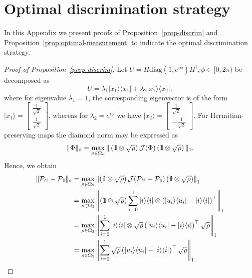 \documentclass[preprint,12pt, a4paper]{elsarticle}
\newcommand{\ket}[1]{\ensuremath{|#1\rangle}}
\newcommand{\bra}[1]{\ensuremath{\langle#1|}}
\newcommand{\ketbra}[2]{\ensuremath{\ket{#1}\bra{#2}}}
\newcommand{\proj}[1]{\ensuremath{\ketbra{#1}{#1}}}
\newcommand{\1}{{\rm 1\hspace{-0.9mm}l}}
\newcommand{\Id}{{\rm 1\hspace{-0.9mm}l}}
\newcommand{\PP}{\mathcal{P}}
\newcommand{\diag}{\mathrm{diag}}
\begin{document}
\section{Optimal discrimination strategy}
In this Appendix we present proofs of Proposition~\ref{prop-discrim} and Proposition~\ref{prop:optimal-measurement} to indicate the optimal discrimination strategy.
\begin{proof}[Proof of Proposition~\ref{prop-discrim}]
	Let $U = H\diag(1, e^{i \phi}) H^\dagger, \phi \in [0, 
	2\pi)$ be decomposed as 
	\begin{equation}
	U= \lambda_1 \ketbra{x_1}{x_1} + \lambda_2 \ketbra{x_1}{x_2}, 
	\end{equation}
	where  for eigenvalue $\lambda_1 = 1$, the corresponding 
	eigenvector is 
	of the form $\ket{x_1} = \left[\begin{array}{c}\frac{1}{\sqrt{2}}\\\frac{1}{\sqrt{2}}\end{array}\right]
	$,
	whereas for  $\lambda_2 = e^{i \phi}$ we have $\ket{x_2} = \left[\begin{array}{c}\frac{1}{\sqrt{2}}\\-\frac{1}{\sqrt{2}}\end{array}\right] 
	$.
	For Hermitian-preserving maps \cite{watrous} the diamond norm may be expressed as
	\begin{equation}
	\| \Phi  \|_\diamond =  \max_{\rho \in \Omega_d} \| \left( \Id \otimes \sqrt{\rho} \right) \mathcal{J}(\Phi)  \left( \Id \otimes \sqrt{\rho} \right)  \|_1.  \end{equation}
	Hence, we obtain
	\begin{equation}
	\begin{split}
	\| \PP_{U} - \PP_{\Id}  \|_\diamond 
	& =  \max_{\rho \in \Omega_2} \left\| \left( \Id \otimes \sqrt{\rho} \right) 
	\mathcal{J}(\PP_{U} - \PP_{\Id} )  \left( \Id \otimes \sqrt{\rho} \right)  \right\|_1   
	\\ 
	& =  \max_{\rho \in \Omega_2} \left\| \left( \Id \otimes \sqrt{\rho} \right) 
	\sum_{i=0}^{1} \proj{i} \otimes \left( \proj{u_i} - \proj{i} \right)^\top  
	\right\|_1  \\ 
	& = \max_{\rho \in \Omega_2} \left\| \sum_{i=0}^{1} \proj{i} \otimes 
	\sqrt{\rho}  \left( \proj{u_i} - \proj{i} \right)^\top \sqrt{\rho}  \right\|_1  
	\\ 
	& = \max_{\rho \in \Omega_2} \left\| \sum_{i=0}^{1}\sqrt{\rho}  \left( 
	\proj{u_i} - \proj{i} \right)^\top \sqrt{\rho}  \right\|_1
	\end{split}

\end{equation}
\end{proof}
\end{document}
